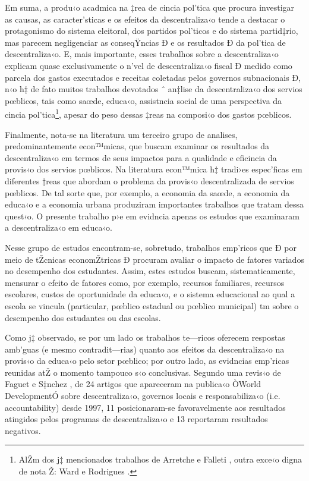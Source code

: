 \documentclass[a4paper, 12pt]{article}
\begin{document}
Em suma, a produ‹o acadmica na ‡rea de cincia pol’tica que procura investigar as causas, as caracter’sticas e os efeitos da descentraliza‹o tende a destacar o protagonismo do sistema eleitoral, dos partidos pol’ticos e do sistema partid‡rio, mas parecem negligenciar as conseqŸncias Ð e os resultados Ð da pol’tica de descentraliza‹o. E, mais importante, esses trabalhos sobre a descentraliza‹o explicam quase exclusivamente o n’vel de descentraliza‹o fiscal Ð medido como parcela dos gastos executados e receitas coletadas pelos governos subnacionais Ð, n‹o h‡ de fato muitos trabalhos devotados ˆ an‡lise da descentraliza‹o dos servios pœblicos, tais como saœde, educa‹o, assistncia social de uma perspectiva da cincia pol’tica\footnote{AlŽm dos j‡ mencionados trabalhos de Arretche \citeyear{arretche_estado_2000} e Falleti \citeyear{falleti_sequential_2005}, outra exce‹o digna de nota Ž: Ward e Rodrigues \citeyear{ward_new_1999}.}, apesar do peso dessas ‡reas na composi‹o dos gastos pœblicos.

Finalmente, nota-se na literatura um terceiro grupo de analises, predominantemente econ™micas, que buscam examinar os resultados da descentraliza‹o em termos de seus impactos para a qualidade e eficincia da provis‹o dos servios pœblicos. Na literatura econ™mica h‡ tradi›es espec’ficas em diferentes ‡reas que abordam o problema da provis‹o descentralizada de servios pœblicos. De tal sorte que, por exemplo, a economia da saœde, a economia da educa‹o e a economia urbana produziram importantes trabalhos que tratam dessa quest‹o. O presente trabalho p›e em evidncia apenas os estudos que examinaram a descentraliza‹o em educa‹o.

Nesse grupo de estudos encontram-se, sobretudo, trabalhos emp’ricos que Ð por meio de tŽcnicas economŽtricas Ð procuram avaliar o impacto de fatores variados no desempenho dos estudantes. Assim, estes estudos buscam, sistematicamente, mensurar o efeito de fatores como, por exemplo, recursos familiares, recursos escolares, custos de oportunidade da educa‹o, e o sistema educacional ao qual a escola se vincula (particular, pœblico estadual ou pœblico municipal) tm sobre o desempenho dos estudantes ou das escolas.

Como j‡ observado, se por um lado os trabalhos te—ricos oferecem respostas amb’guas (e mesmo contradit—rias) quanto aos efeitos da descentraliza‹o na provis‹o da educa‹o pelo setor pœblico; por outro lado, as evidncias emp’ricas reunidas atŽ o momento tampouco s‹o conclusivas. Segundo uma revis‹o de Faguet e S‡nchez \citeyear{faguet_decentralizations_2008}, de 24 artigos que apareceram na publica‹o ÒWorld DevelopmentÓ sobre descentraliza‹o, governos locais e responsabiliza‹o (i.e. accountability) desde 1997, 11 posicionaram-se favoravelmente aos resultados atingidos pelos programas de descentraliza‹o e 13 reportaram resultados negativos.
\end{document}
